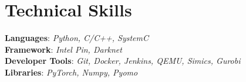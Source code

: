 \documentclass[letterpaper,11pt]{article}
\makeatletter
\newcommand{\resumeItem}[1]{
  \item\small{
    {#1 \vspace{-2pt}}
  }
}
\newcommand{\resumeProjectHeading}[2]{
    \item
    \begin{tabular*}{0.97\textwidth}{l@{\extracolsep{\fill}}r}
      \small#1 & #2 \\
    \end{tabular*}\vspace{-7pt}
}
\newcommand{\resumeSubHeadingListStart}{\begin{itemize}[leftmargin=0.15in, label={}]}
\newcommand{\resumeSubHeadingListEnd}{\end{itemize}}
\newcommand{\resumeItemListStart}{\begin{itemize}}
\newcommand{\resumeItemListEnd}{\end{itemize}\vspace{-5pt}}
\makeatother
\begin{document}
%


%
\section{Technical Skills}
 \begin{itemize}[leftmargin=0.15in, label={}]
    \small{\item{
     \textbf{Languages}{: \emph{Python, C/C++, SystemC}} \\
     \textbf{Framework}{: \emph{Intel Pin, Darknet}} \\
     \textbf{Developer Tools}{: \emph{Git, Docker, Jenkins, QEMU, Simics, Gurobi}} \\
     \textbf{Libraries}{: \emph{PyTorch, Numpy, Pyomo}}
    }}
 \end{itemize}

\end{document}
